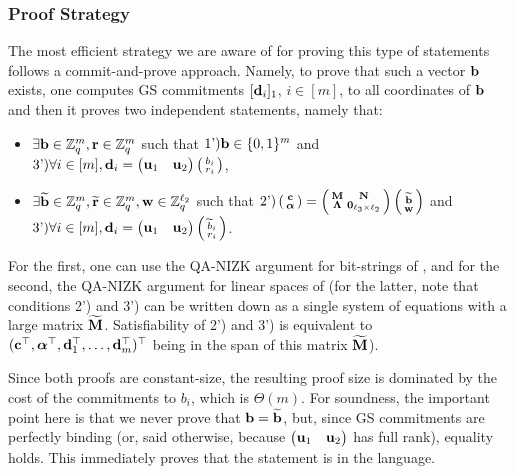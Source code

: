 \subsubsection{Proof Strategy} The most efficient strategy we are aware of for proving this type of statements follows a 
 commit-and-prove approach. Namely, to prove that such a vector $\mathbf{b}$ exists, one computes 
GS commitments $[\mathbf{d}_i]_1$, $i \in [m]$, to all coordinates of $\mathbf{b}$ and then it proves two independent statements, namely that:
\vspace{-0.2cm}
\begin{itemize}
\item $\exists \mathbf{b}\in \mathbb{Z}_q^{m}, \mathbf{r} \in \mathbb{Z}_q^m$ such that  
$\text{1')} \mathbf{b}\in \{0,1\}^{m}$ and $\text{3')} \forall i \in [{m}], \mathbf{d}_i=\begin{pmatrix} \mathbf{u}_1 &   \mathbf{u}_2 \end{pmatrix}   \left(\begin{smallmatrix}b_i  \\ r_i\end{smallmatrix}\right)$,
\item   $\exists \widetilde{\mathbf{b}} \in \mathbb{Z}_q^{m},  \widetilde{\mathbf{r}} \in \mathbb{Z}_q^m, \mathbf{w} \in\mathbb{Z}_q^{\ell_2}$ such that  
   $\text{2')} \left(\begin{smallmatrix}
    \mathbf{c}\\
    {\boldsymbol \alpha}
\end{smallmatrix}\right)
=
\left(\begin{smallmatrix}
    \mathbf{{M}}       & \mathbf{{N}}\\
    \mathbf{{\Lambda}} & \mathbf{{0}}_{{\ell_3}\times {\ell_2}}
\end{smallmatrix}\right)
\left(\begin{smallmatrix}
    \widetilde{\mathbf{b}}\\
    \mathbf{w}
\end{smallmatrix}\right)$ and $\text{3')} \forall i \in [m], \mathbf{d}_i=\begin{pmatrix} \mathbf{u}_1 &   \mathbf{u}_2 \end{pmatrix}   \left(\begin{smallmatrix}
\widetilde{b}_i  \\ r_i\end{smallmatrix}\right)$.
\end{itemize}
For the first, one can use the QA-NIZK argument for bit-strings of \cite{AC:GonHevRaf15}, and for the second, the QA-NIZK argument for linear spaces of \cite{C:JutRoy14,EC:KilWee15} (for the latter, note that conditions 2') and 3') can be written down as a single system of equations with a large matrix $\widetilde{\mathbf{{M}}}$. Satisfiability of 
2') and 3') is equivalent to  $(\mathbf{c}^{\top},{\boldsymbol \alpha}^{\top},\mathbf{d}_1^{\top}, \ldots, \mathbf{d}_m^{\top})^\top$ being in the span 
of this matrix $\widetilde{\mathbf{{M}}}$).

Since both proofs are constant-size, the resulting proof size is dominated by the cost of the commitments to $b_i$, which is $\Theta(m)$. 
For soundness, the important point here is that we never prove that $\mathbf{b}=\widetilde{\mathbf{b}}$, but, since GS commitments are perfectly binding (or, said otherwise, because $\begin{pmatrix} \mathbf{u}_1 &   \mathbf{u}_2 \end{pmatrix}$
has full rank), equality holds. This immediately proves that the statement is in the language.  
